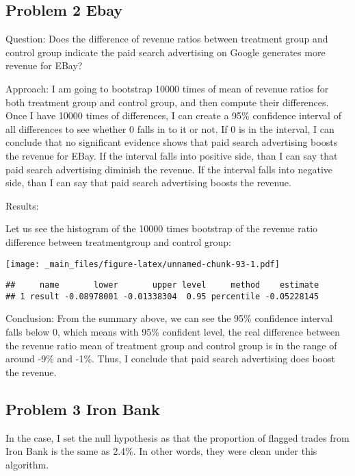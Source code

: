 \documentclass[
]{article}
\begin{document}
\hypertarget{problem-2-ebay}{%
\subsection{Problem 2 Ebay}\label{problem-2-ebay}}

Question: Does the difference of revenue ratios between treatment group and control group indicate the paid search advertising on Google generates more revenue for EBay?

Approach: I am going to bootstrap 10000 times of mean of revenue ratios for both treatment group and control group, and then compute their differences. Once I have 10000 times of differences, I can create a 95\% confidence interval of all differences to see whether 0 falls in to it or not. If 0 is in the interval, I can conclude that no significant evidence shows that paid search advertising boosts the revenue for EBay. If the interval falls into positive side, than I can say that paid search advertising diminish the revenue. If the interval falls into negative side, than I can say that paid search advertising boosts the revenue.

Results:

Let us see the histogram of the 10000 times bootstrap of the revenue ratio difference between treatmentgroup and control group:

\texttt{[image: \_main\_files/figure-latex/unnamed-chunk-93-1.pdf]}

\begin{verbatim}
##     name       lower       upper level     method    estimate
## 1 result -0.08978001 -0.01338304  0.95 percentile -0.05228145
\end{verbatim}

Conclusion: From the summary above, we can see the 95\% confidence interval falls below 0, which means with 95\% confident level, the real difference between the revenue ratio mean of treatment group and control group is in the range of around -9\% and -1\%. Thus, I conclude that paid search advertising does boost the revenue.

\hypertarget{problem-3-iron-bank}{%
\subsection{Problem 3 Iron Bank}\label{problem-3-iron-bank}}

In the case, I set the null hypothesis as that the proportion of flagged trades from Iron Bank is the same as 2.4\%. In other words, they were clean under this algorithm.
\end{document}

